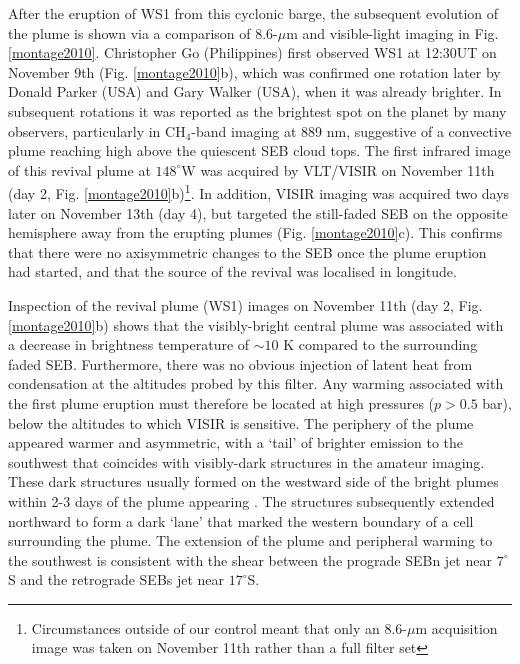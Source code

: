 \documentclass[final,authoryear,5p,times,twocolumn]{elsarticle}
\begin{document}
After the eruption of WS1 from this cyclonic barge, the subsequent evolution of the plume is shown via a comparison of 8.6-$\mu$m and visible-light imaging in Fig. \ref{montage2010}.  Christopher Go (Philippines) first observed WS1 at 12:30UT on November 9th (Fig. \ref{montage2010}b), which was confirmed one rotation later by Donald Parker (USA) and Gary Walker (USA), when it was already brighter.  In subsequent rotations it was reported as the brightest spot on the planet by many observers, particularly in CH$_4$-band imaging at 889 nm, suggestive of a convective plume reaching high above the quiescent SEB cloud tops.  The first infrared image of this revival plume at $148^\circ$W was acquired by VLT/VISIR on November 11th (day 2, Fig. \ref{montage2010}b)\footnote{Circumstances outside of our control meant that only an 8.6-$\mu$m acquisition image was taken on November 11th rather than a full filter set}.  In addition, VISIR imaging was acquired two days later on November 13th (day 4), but targeted the still-faded SEB on the opposite hemisphere away from the erupting plumes (Fig. \ref{montage2010}c).  This confirms that there were no axisymmetric changes to the SEB once the plume eruption had started, and that the source of the revival was localised in longitude.  

Inspection of the revival plume (WS1) images on November 11th (day 2, Fig. \ref{montage2010}b) shows that the visibly-bright central plume was associated with a decrease in brightness temperature of $\sim10$ K compared to the surrounding faded SEB.  Furthermore, there was no obvious injection of latent heat from condensation at the altitudes probed by this filter.  Any warming associated with the first plume eruption must therefore be located at high pressures ($p>0.5$ bar), below the altitudes to which VISIR is sensitive.  The periphery of the plume appeared warmer and asymmetric, with a `tail' of brighter emission to the southwest that coincides with visibly-dark structures in the amateur imaging.  These dark structures usually formed on the westward side of the bright plumes within 2-3 days of the plume appearing \citep{11rogers_21, 16rogers}.  The structures subsequently extended northward to form a dark `lane' that marked the western boundary of a cell surrounding the plume.   The extension of the plume and peripheral warming to the southwest is consistent with the shear between the prograde SEBn jet near $7^\circ$S and the retrograde SEBs jet near $17^\circ$S.  
\end{document}
